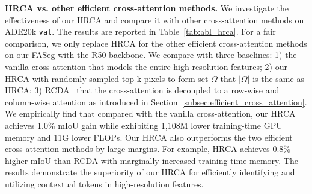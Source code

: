 \begin{table}[t!]
\centering
\caption{Effect of $|\Omega|$ in our efficient HRCA on ADE20K \texttt{val}~\cite{zhou2017scene} with 150 categories. \#F indicates the number of FLOPs (G).}
\vspace{-0.5em}
\label{tab:abl_cross}
  \vspace{-1em}
\end{table}

\noindent\textbf{HRCA vs. other efficient cross-attention methods.} We investigate the effectiveness of our HRCA and compare it with other cross-attention methods on ADE20k \texttt{val}. The results are reported in Table~\ref{tab:abl_hrca}. For a fair comparison, we only replace HRCA for the other efficient cross-attention methods on our FASeg with the R50 backbone. We compare with three baselines: 1) the vanilla cross-attention that models the entire high-resolution features; 2) our HRCA with randomly sampled top-k pixels to form set $\Omega$ that $|\Omega|$ is the same as HRCA; 3) RCDA~\cite{wang2021anchor} that the cross-attention is decoupled to a row-wise and column-wise attention as introduced in Section~\ref{subsec:efficient_cross_attention}. We empirically find that compared with the vanilla cross-attention, our HRCA achieves 1.0\% mIoU gain while exhibiting 1,108M lower training-time GPU memory and 11G lower FLOPs. Our HRCA also outperforms the two efficient cross-attention methods by large margins. For example, HRCA achieves 0.8\% higher mIoU than RCDA with marginally increased training-time memory. The results demonstrate the superiority of our HRCA for efficiently identifying and utilizing contextual tokens in high-resolution features.

